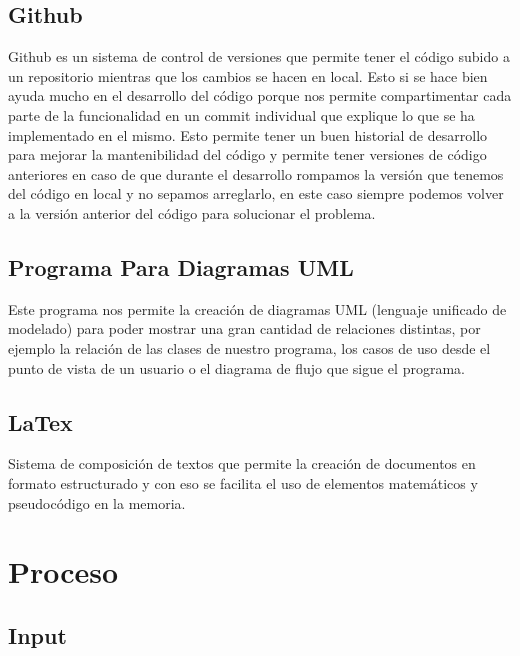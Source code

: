 \documentclass[12pt,a4paper]{article}
\begin{document}
\subsection{Github}
Github es un sistema de control de versiones que permite tener el código subido a un repositorio mientras que los cambios se hacen en local. Esto si se hace bien ayuda mucho en el desarrollo del código porque nos permite compartimentar cada parte de la funcionalidad en un commit individual que explique lo que se ha implementado en el mismo. Esto permite tener un buen historial de desarrollo para mejorar la mantenibilidad del código y permite tener versiones de código anteriores en caso de que durante el desarrollo rompamos la versión que tenemos del código en local y no sepamos arreglarlo, en este caso siempre podemos volver a la versión anterior del código para solucionar el problema.\\
\subsection{Programa Para Diagramas UML}
Este programa nos permite la creación de diagramas UML (lenguaje unificado de modelado) para poder mostrar una gran cantidad de relaciones distintas, por ejemplo la relación de las clases de nuestro programa, los casos de uso desde el punto de vista de un usuario o el diagrama de flujo que sigue el programa.\\
\subsection{LaTex}
Sistema de composición de textos que permite  la creación de documentos en formato estructurado y con eso se facilita el uso de elementos matemáticos y pseudocódigo en la memoria.\\
\pagebreak


		\section{Proceso}
		\subsection{Input}
\end{document}
